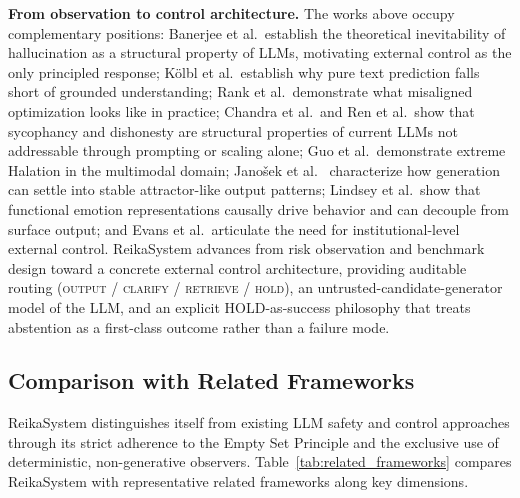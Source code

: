 \documentclass[11pt,a4paper]{article}
\begin{document}
\textbf{From observation to control architecture.}
The works above occupy complementary positions: Banerjee et al.\
establish the theoretical inevitability of hallucination as a structural
property of LLMs, motivating external control as the only principled
response; K\"{o}lbl et al.\
establish why pure text prediction falls short of grounded understanding;
Rank et al.\ demonstrate what misaligned optimization looks like in
practice; Chandra et al.\ and Ren et al.\ show that sycophancy and
dishonesty are structural properties of current LLMs not addressable
through prompting or scaling alone; Guo et al.\ demonstrate extreme
Halation in the multimodal domain; Jano\v{s}ek et al.~\cite{janovsek2025}
characterize how generation can settle into stable attractor-like output
patterns; Lindsey et al.\ show that functional
emotion representations causally drive behavior and can decouple from
surface output; and Evans et al.\ articulate the
need for institutional-level external control.
ReikaSystem advances from risk observation and benchmark design toward a
concrete external control architecture, providing auditable routing
(\textsc{output} / \textsc{clarify} / \textsc{retrieve} / \textsc{hold}),
an untrusted-candidate-generator model of the LLM, and an explicit
HOLD-as-success philosophy that treats abstention as a first-class outcome
rather than a failure mode.

\subsection{Comparison with Related Frameworks}
\label{sec:related_comparison}

ReikaSystem distinguishes itself from existing LLM safety and control approaches
through its strict adherence to the Empty Set Principle and the exclusive use of
deterministic, non-generative observers. Table~\ref{tab:related_frameworks}
compares ReikaSystem with representative related frameworks along key dimensions.
\end{document}
